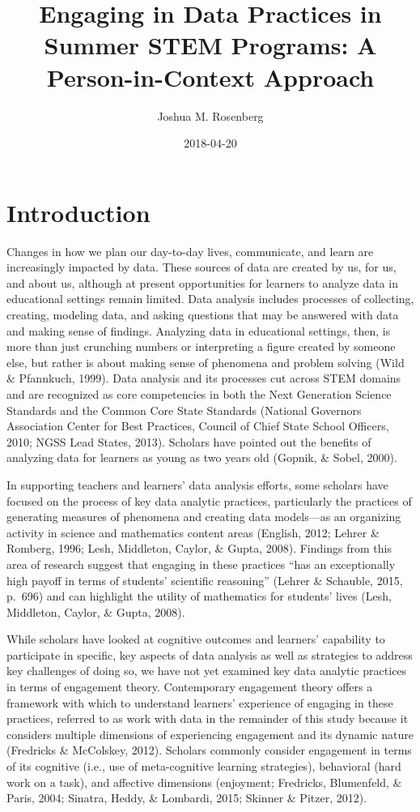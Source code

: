 \documentclass[]{book}
\title{Engaging in Data Practices in Summer STEM Programs: A Person-in-Context
Approach}
\author{Joshua M. Rosenberg}
\date{2018-04-20}
\theoremstyle{definition}
\theoremstyle{definition}
\theoremstyle{definition}
\theoremstyle{remark}
\begin{document}
\maketitle

{
\setcounter{tocdepth}{1}
\tableofcontents
}
\chapter{Introduction}\label{intro-placemarker}

Changes in how we plan our day-to-day lives, communicate, and learn are
increasingly impacted by data. These sources of data are created by us,
for us, and about us, although at present opportunities for learners to
analyze data in educational settings remain limited. Data analysis
includes processes of collecting, creating, modeling data, and asking
questions that may be answered with data and making sense of findings.
Analyzing data in educational settings, then, is more than just
crunching numbers or interpreting a figure created by someone else, but
rather is about making sense of phenomena and problem solving (Wild \&
Pfannkuch, 1999). Data analysis and its processes cut across STEM
domains and are recognized as core competencies in both the Next
Generation Science Standards and the Common Core State Standards
(National Governors Association Center for Best Practices, Council of
Chief State School Officers, 2010; NGSS Lead States, 2013). Scholars
have pointed out the benefits of analyzing data for learners as young as
two years old (Gopnik, \& Sobel, 2000).

In supporting teachers and learners' data analysis efforts, some
scholars have focused on the process of key data analytic practices,
particularly the practices of generating measures of phenomena and
creating data models---as an organizing activity in science and
mathematics content areas (English, 2012; Lehrer \& Romberg, 1996; Lesh,
Middleton, Caylor, \& Gupta, 2008). Findings from this area of research
suggest that engaging in these practices ``has an exceptionally high
payoff in terms of students' scientific reasoning'' (Lehrer \& Schauble,
2015, p.~696) and can highlight the utility of mathematics for students'
lives (Lesh, Middleton, Caylor, \& Gupta, 2008).

While scholars have looked at cognitive outcomes and learners'
capability to participate in specific, key aspects of data analysis as
well as strategies to address key challenges of doing so, we have not
yet examined key data analytic practices in terms of engagement theory.
Contemporary engagement theory offers a framework with which to
understand learners' experience of engaging in these practices, referred
to as work with data in the remainder of this study because it considers
multiple dimensions of experiencing engagement and its dynamic nature
(Fredricks \& McColskey, 2012). Scholars commonly consider engagement in
terms of its cognitive (i.e., use of meta-cognitive learning
strategies), behavioral (hard work on a task), and affective dimensions
(enjoyment; Fredricks, Blumenfeld, \& Paris, 2004; Sinatra, Heddy, \&
Lombardi, 2015; Skinner \& Pitzer, 2012).
\end{document}
